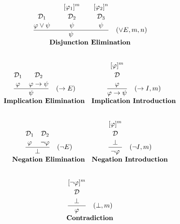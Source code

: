 \[
\begin{array}{c c}
\multicolumn{2}{c}{
\frac{\overset{\displaystyle\mathcal{D}_1 \strut} {\displaystyle\varphi \vee \psi \strut} \quad \quad \overset{\displaystyle[\varphi_1]^m\strut}{\overset{\displaystyle\mathcal{D}_2 \strut} {\displaystyle\psi 
\strut}} \quad \quad \overset{\displaystyle[\varphi_2]^n\strut}{\overset{\displaystyle\mathcal{D}_3 \strut} {\displaystyle\psi 
\strut}}}{\displaystyle\psi\strut} \quad (\vee E, m, n)
} \\[5pt]
\multicolumn{2}{c}{\textbf{Disjunction Elimination}} \\[10pt]
\end{array}
\]

\[
\begin{array}{c c}
\frac{\overset{\displaystyle\mathcal{D}_1\strut}{\displaystyle \varphi \strut}\quad \overset{\displaystyle\mathcal{D}_2\strut} {\displaystyle \varphi \to \psi \strut}}{\displaystyle\psi\strut} \quad (\to E) 
& \frac{\overset{\displaystyle[\varphi]^m\strut}{\overset{\displaystyle\mathcal{D} \strut} {\displaystyle\varphi 
\strut}}}{\displaystyle \varphi \to \psi \strut} \quad (\to I, m) \\[5pt]
\textbf{Implication Elimination} & \textbf{Implication Introduction}\\[10pt]
\end{array}
\]

\[
\begin{array}{c c}
\frac{\overset{\displaystyle\mathcal{D}_1\strut}{\displaystyle \varphi \strut}\quad \overset{\displaystyle\mathcal{D}_2\strut} {\displaystyle \neg \varphi \strut}}{\displaystyle\bot\strut} \quad (\neg E) 
& \frac{\overset{\displaystyle[\varphi]^m\strut}{\overset{\displaystyle\mathcal{D} \strut} {\displaystyle\bot 
\strut}}}{\displaystyle\neg \varphi\strut} \quad (\neg I, m) \\[5pt]
\textbf{Negation Elimination} & \textbf{Negation Introduction}\\[10pt]
\end{array}
\]

\[
\begin{array}{c c}
\multicolumn{2}{c}{
\frac{\overset{\displaystyle[\neg\varphi]^m\strut}{\overset{\displaystyle\mathcal{D} \strut} {\displaystyle\bot 
\strut}}}{\displaystyle \varphi\strut} \quad (\bot, m)
} \\[5pt]
\multicolumn{2}{c}{\textbf{Contradiction}} \\[10pt]
\end{array}
\]

